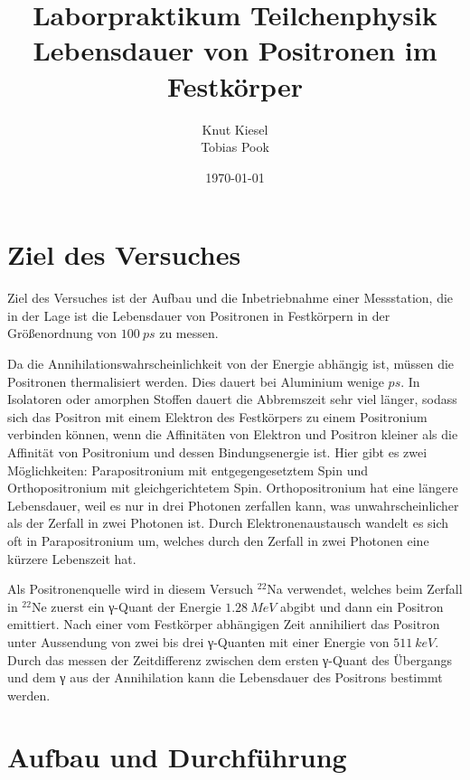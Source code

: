 \documentclass[a4paper,12pt]{article}
\title{Laborpraktikum Teilchenphysik\\ Lebensdauer von Positronen im Festkörper}
\author{Knut Kiesel\\Tobias Pook}
\date{\today}
\begin{document}
\maketitle
\vspace{5cm}
\tableofcontents
\thispagestyle{empty}
\newpage
\setcounter{page}{1}

\section{Ziel des Versuches}
Ziel des Versuches ist der Aufbau und die Inbetriebnahme einer Messstation,
die in der Lage ist die Lebensdauer von Positronen in Festkörpern in der
Größenordnung von $\SI{100}{ps}$ zu messen.

Da die Annihilationswahrscheinlichkeit von der Energie abhängig ist,
müssen die Positronen thermalisiert werden.
Dies dauert bei Aluminium wenige $\si{ps}$.
In Isolatoren oder amorphen Stoffen dauert die Abbremszeit sehr viel länger,
sodass sich das Positron mit einem Elektron des Festkörpers zu einem Positronium verbinden können,
wenn die Affinitäten von Elektron und Positron kleiner
als die Affinität von Positronium und dessen Bindungsenergie ist.
Hier gibt es zwei Möglichkeiten: Parapositronium mit entgegengesetztem Spin und Orthopositronium mit gleichgerichtetem Spin.
Orthopositronium hat eine längere Lebensdauer, weil es nur in drei Photonen zerfallen kann, was unwahrscheinlicher als der Zerfall in zwei Photonen ist.
Durch Elektronenaustausch wandelt es sich oft in Parapositronium um, welches durch den Zerfall in zwei Photonen eine kürzere Lebenszeit hat.

Als Positronenquelle wird in diesem Versuch $^{22}$Na verwendet, welches beim Zerfall in $^{22}$Ne
zuerst ein γ-Quant der Energie $\SI{1.28}{MeV}$ abgibt und dann ein Positron emittiert.
Nach einer vom Festkörper abhängigen Zeit annihiliert das Positron unter Aussendung
von zwei bis drei γ-Quanten mit einer Energie von $\SI{511}{keV}$.
Durch das messen der Zeitdifferenz zwischen dem ersten γ-Quant des Übergangs und dem
γ aus der Annihilation kann die Lebensdauer des Positrons bestimmt werden.


\section{Aufbau und Durchführung}
\end{document}
